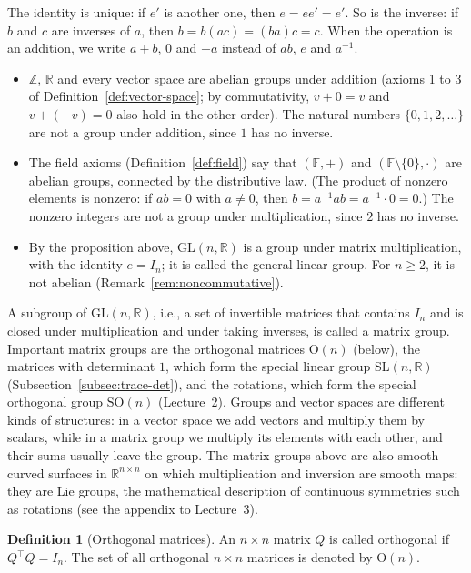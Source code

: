 \documentclass[11pt]{article}
\theoremstyle{definition}
\newtheorem{definition}{Definition}[section]
\theoremstyle{plain}
\theoremstyle{remark}
\begin{document}
The identity is unique: if $e'$ is another one, then $e = ee' = e'$. So is the inverse: if $b$ and $c$ are inverses of $a$, then $b = b(ac) = (ba)c = c$. When the operation is an addition, we write $a + b$, $0$ and $-a$ instead of $ab$, $e$ and $a^{-1}$.
\begin{itemize}
    \item $\mathbb{Z}$, $\mathbb{R}$ and every vector space are abelian groups under addition (axioms 1 to 3 of Definition~\ref{def:vector-space}; by commutativity, $v + 0 = v$ and $v + (-v) = 0$ also hold in the other order). The natural numbers $\{0, 1, 2, \ldots\}$ are not a group under addition, since $1$ has no inverse.
    \item The field axioms (Definition~\ref{def:field}) say that $(\mathbb{F}, +)$ and $(\mathbb{F} \setminus \{0\}, \cdot)$ are abelian groups, connected by the distributive law. (The product of nonzero elements is nonzero: if $ab = 0$ with $a \neq 0$, then $b = a^{-1}ab = a^{-1} \cdot 0 = 0$.) The nonzero integers are not a group under multiplication, since $2$ has no inverse.
    \item By the proposition above, $\mathrm{GL}(n, \mathbb{R})$ is a group under matrix multiplication, with the identity $e = I_n$; it is called the general linear group. For $n \geq 2$, it is not abelian (Remark~\ref{rem:noncommutative}).
\end{itemize}
A subgroup of $\mathrm{GL}(n, \mathbb{R})$, i.e., a set of invertible matrices that contains $I_n$ and is closed under multiplication and under taking inverses, is called a matrix group. Important matrix groups are the orthogonal matrices $\mathrm{O}(n)$ (below), the matrices with determinant $1$, which form the special linear group $\mathrm{SL}(n, \mathbb{R})$ (Subsection~\ref{subsec:trace-det}), and the rotations, which form the special orthogonal group $\mathrm{SO}(n)$ (Lecture~2). Groups and vector spaces are different kinds of structures: in a vector space we add vectors and multiply them by scalars, while in a matrix group we multiply its elements with each other, and their sums usually leave the group. The matrix groups above are also smooth curved surfaces in $\mathbb{R}^{n \times n}$ on which multiplication and inversion are smooth maps: they are Lie groups, the mathematical description of continuous symmetries such as rotations (see the appendix to Lecture~3).

\begin{definition}[Orthogonal matrices]
    An $n \times n$ matrix $Q$ is called orthogonal if $Q^\top Q = I_n$. The set of all orthogonal $n \times n$ matrices is denoted by $\mathrm{O}(n)$.
\end{definition}
\end{document}
